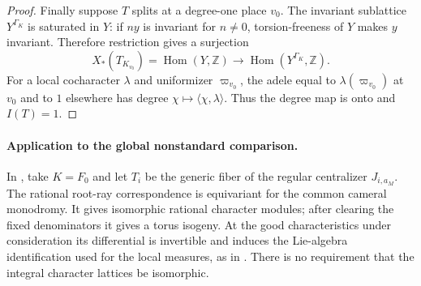 \begin{proof}
Finally suppose $T$ splits at a degree-one place $v_0$.
The invariant sublattice $Y^{\Gamma_K}$ is saturated in $Y$:
if $ny$ is invariant for $n\ne0$, torsion-freeness of $Y$ makes $y$
invariant.  Therefore restriction gives a surjection
\[
 X_*(T_{K_{v_0}})=\operatorname{Hom}(Y,\mathbb Z)
   \longrightarrow\operatorname{Hom}(Y^{\Gamma_K},\mathbb Z).
\]
For a local cocharacter $\lambda$ and uniformizer $\varpi_{v_0}$,
the adele equal to $\lambda(\varpi_{v_0})$ at $v_0$ and to $1$
elsewhere has degree $\chi\mapsto\langle\chi,\lambda\rangle$.
Thus the degree map is onto and $I(T)=1$.
\end{proof}

\paragraph{Application to the global nonstandard comparison.}
In \citet[Corollary~17.11, equation~(17.2.2)]{HalleckDubeWFLDraft},
take $K=F_0$ and let $T_i$ be the generic fiber of the regular
centralizer $J_{i,a_M}$.  The rational root-ray correspondence is
equivariant for the common cameral monodromy.  It gives isomorphic
rational character modules; after clearing the fixed denominators it
gives a torus isogeny.  At the good characteristics under consideration
its differential is invertible and induces the Lie-algebra
identification used for the local measures, as in
\citet[Section~1.12, before Theorem~1.12.7]{Ngo2010FundamentalLemma}.
There is no requirement that the integral character lattices be
isomorphic.

